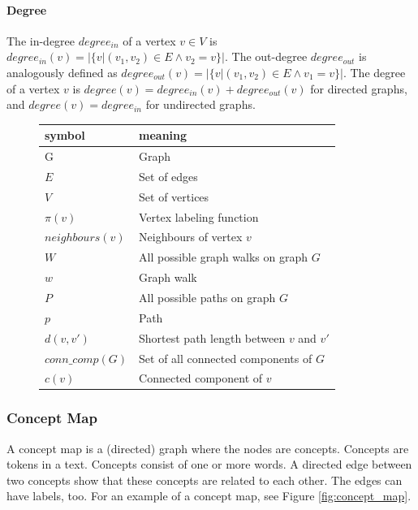 \paragraph{Degree}
The in-degree $degree_{in}$ of a vertex $v \in V$ is $degree_{in}(v) = |\{v | (v_1, v_2) \in E \land v_2 = v\}|$.
The out-degree $degree_{out}$ is analogously defined as $degree_{out}(v) = |\{v | (v_1, v_2) \in E \land v_1 = v\}|$.
The degree of a vertex $v$ is $degree(v) = degree_{in}(v) + degree_{out}(v)$ for directed graphs, and $degree(v) = degree_{in}$ for undirected graphs.

\begin{figure}[ht]
\centering
\begin{tabular}{ll}
symbol &  meaning \\
\midrule
G & Graph \\
$E$ & Set of edges \\
$V$ & Set of vertices \\
$\pi(v)$ & Vertex labeling function \\
$neighbours(v)$ & Neighbours of vertex $v$ \\
$W$ & All possible graph walks on graph $G$ \\
$w$ & Graph walk \\
$P$ & All possible paths on graph $G$ \\
$p$ & Path \\
$d(v, v')$ & Shortest path length between $v$ and $v'$ \\
$conn\_comp(G)$ & Set of all connected components of $G$ \\
$c(v)$ & Connected component of $v$ \\
\end{tabular}
\end{figure}

\subsubsection{Concept Map}
A concept map is a (directed) graph where the nodes are concepts.
Concepts are tokens in a text.
Concepts consist of one or more words.
A directed edge between two concepts show that these concepts are related to each other. The edges can have labels, too.
For an example of a concept map, see Figure \ref{fig:concept_map}.

